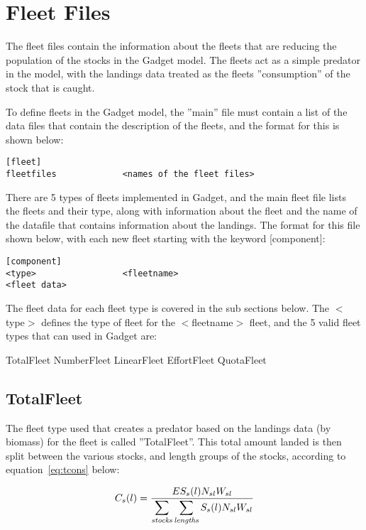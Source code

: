 \documentclass[10pt,twoside]{book}
\begin{document}
\chapter{Fleet Files}\label{chap:fleet}
The fleet files contain the information about the fleets that are reducing the population of the stocks in the Gadget model.  The fleets act as a simple predator in the model, with the landings data treated as the fleets ''consumption'' of the stock that is caught.

\bigskip
To define fleets in the Gadget model, the ''main'' file must contain a list of the data files that contain the description of the fleets, and the format for this is shown below:

{\small\begin{verbatim}
[fleet]
fleetfiles             <names of the fleet files>
\end{verbatim}}

There are 5 types of fleets implemented in Gadget, and the main fleet file lists the fleets and their type, along with information about the fleet and the name of the datafile that contains information about the landings.  The format for this file shown below, with each new fleet starting with the keyword [component]:

{\small\begin{verbatim}
[component]
<type>                 <fleetname>
<fleet data>
\end{verbatim}}

The fleet data for each fleet type is covered in the sub sections below.  The $<$type$>$ defines the type of fleet for the $<$fleetname$>$ fleet, and the 5 valid fleet types that can used in Gadget are:

\bigskip
TotalFleet\newline
NumberFleet\newline
LinearFleet\newline
EffortFleet\newline
QuotaFleet

\section{TotalFleet}\label{sec:totalfleet}
The fleet type used that creates a predator based on the landings data (by biomass) for the fleet is called ''TotalFleet''.  This total amount landed is then split between the various stocks, and length groups of the stocks, according to equation~\ref{eq:tcons} below:

\begin{equation}\label{eq:tcons}
C_{s}(l) = \frac{E S_{s}(l) N_{sl} W_{sl}}{\displaystyle \sum_{\it stocks} \sum_{\it lengths} S_{s}(l) N_{sl} W_{sl}}
\end{equation}
\end{document}
